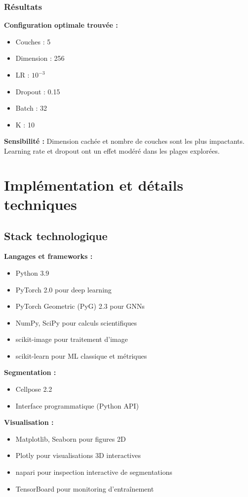 \subsubsection{Résultats}

\textbf{Configuration optimale trouvée :}
\begin{itemize}
    \item Couches : 5
    \item Dimension : 256
    \item LR : $10^{-3}$
    \item Dropout : 0.15
    \item Batch : 32
    \item K : 10
\end{itemize}

\textbf{Sensibilité :}
Dimension cachée et nombre de couches sont les plus impactants. Learning rate et dropout ont un effet modéré dans les plages explorées.

\section{Implémentation et détails techniques}

\subsection{Stack technologique}

\textbf{Langages et frameworks :}
\begin{itemize}
    \item Python 3.9
    \item PyTorch 2.0 pour deep learning
    \item PyTorch Geometric (PyG) 2.3 pour GNNs
    \item NumPy, SciPy pour calculs scientifiques
    \item scikit-image pour traitement d'image
    \item scikit-learn pour ML classique et métriques
\end{itemize}

\textbf{Segmentation :}
\begin{itemize}
    \item Cellpose 2.2
    \item Interface programmatique (Python API)
\end{itemize}

\textbf{Visualisation :}
\begin{itemize}
    \item Matplotlib, Seaborn pour figures 2D
    \item Plotly pour visualisations 3D interactives
    \item napari pour inspection interactive de segmentations
    \item TensorBoard pour monitoring d'entraînement
\end{itemize}

